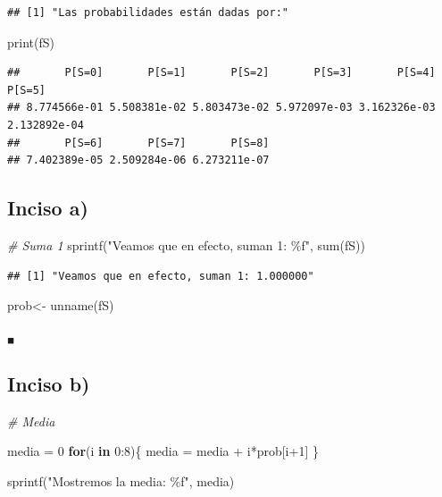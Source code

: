 \documentclass[
]{article}
\newenvironment{Shaded}{\begin{snugshade}}{\end{snugshade}}
\newcommand{\CommentTok}[1]{\textcolor[rgb]{0.56,0.35,0.01}{\textit{#1}}}
\newcommand{\ControlFlowTok}[1]{\textcolor[rgb]{0.13,0.29,0.53}{\textbf{#1}}}
\newcommand{\DecValTok}[1]{\textcolor[rgb]{0.00,0.00,0.81}{#1}}
\newcommand{\FunctionTok}[1]{\textcolor[rgb]{0.00,0.00,0.00}{#1}}
\newcommand{\NormalTok}[1]{#1}
\newcommand{\OtherTok}[1]{\textcolor[rgb]{0.56,0.35,0.01}{#1}}
\newcommand{\SpecialCharTok}[1]{\textcolor[rgb]{0.00,0.00,0.00}{#1}}
\newcommand{\StringTok}[1]{\textcolor[rgb]{0.31,0.60,0.02}{#1}}
\begin{document}
\begin{verbatim}
## [1] "Las probabilidades están dadas por:"
\end{verbatim}

\begin{Shaded}
\begin{Highlighting}[]
\FunctionTok{print}\NormalTok{(fS)}
\end{Highlighting}
\end{Shaded}

\begin{verbatim}
##       P[S=0]       P[S=1]       P[S=2]       P[S=3]       P[S=4]       P[S=5] 
## 8.774566e-01 5.508381e-02 5.803473e-02 5.972097e-03 3.162326e-03 2.132892e-04 
##       P[S=6]       P[S=7]       P[S=8] 
## 7.402389e-05 2.509284e-06 6.273211e-07
\end{verbatim}

\hypertarget{inciso-a-5}{%
\subsection{Inciso a)}\label{inciso-a-5}}

\begin{Shaded}
\begin{Highlighting}[]
\CommentTok{\# Suma 1}
\FunctionTok{sprintf}\NormalTok{(}\StringTok{"Veamos que en efecto, suman 1: \%f"}\NormalTok{, }\FunctionTok{sum}\NormalTok{(fS))}
\end{Highlighting}
\end{Shaded}

\begin{verbatim}
## [1] "Veamos que en efecto, suman 1: 1.000000"
\end{verbatim}

\begin{Shaded}
\begin{Highlighting}[]
\NormalTok{prob}\OtherTok{\textless{}{-}} \FunctionTok{unname}\NormalTok{(fS)}
\end{Highlighting}
\end{Shaded}

\(_\blacksquare\)

\hypertarget{inciso-b-4}{%
\subsection{Inciso b)}\label{inciso-b-4}}

\begin{Shaded}
\begin{Highlighting}[]
\CommentTok{\# Media}

\NormalTok{media }\OtherTok{=} \DecValTok{0}
\ControlFlowTok{for}\NormalTok{(i }\ControlFlowTok{in} \DecValTok{0}\SpecialCharTok{:}\DecValTok{8}\NormalTok{)\{}
\NormalTok{  media }\OtherTok{=}\NormalTok{ media }\SpecialCharTok{+}\NormalTok{ i}\SpecialCharTok{*}\NormalTok{prob[i}\SpecialCharTok{+}\DecValTok{1}\NormalTok{]}
\NormalTok{\}}

\FunctionTok{sprintf}\NormalTok{(}\StringTok{"Mostremos la media: \%f"}\NormalTok{, media)}
\end{Highlighting}
\end{Shaded}
\end{document}
